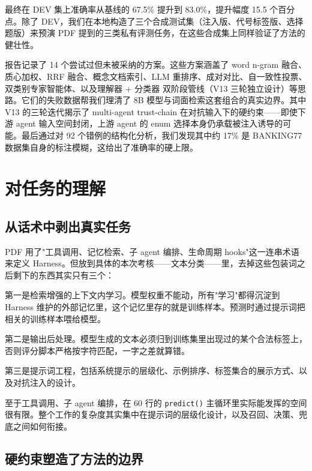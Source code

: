 \documentclass[11pt,a4paper]{article}
\begin{document}
最终在 DEV 集上准确率从基线的 67.5\% 提升到 83.0\%，提升幅度 15.5 个百分点。除了 DEV，我们在本地构造了三个合成测试集（注入版、代号标签版、选择题版）来预演 PDF 提到的三类私有评测任务，在这些合成集上同样验证了方法的健壮性。

报告记录了 14 个尝试过但未被采纳的方案。这些方案涵盖了 word n-gram 融合、质心加权、RRF 融合、概念文档索引、LLM 重排序、成对对比、自一致性投票、双类别专家智能体、以及理解器 + 分类器 双阶段管线（V13 三轮独立设计）等思路。它们的失败数据帮我们理清了 8B 模型与词面检索这套组合的真实边界。其中 V13 的三轮迭代揭示了 multi-agent trust-chain 在对抗输入下的硬约束——即使下游 agent 输入空间封闭，上游 agent 的 enum 选择本身仍承载被注入诱导的可能。最后通过对 92 个错例的结构化分析，我们发现其中约 17\% 是 BANKING77 数据集自身的标注模糊，这给出了准确率的硬上限。

\tableofcontents
\newpage

\section{对任务的理解}
\label{sec:problem}

\subsection{从话术中剥出真实任务}

PDF 用了"工具调用、记忆检索、子 agent 编排、生命周期 hooks"这一连串术语来定义 Harness。但放到具体的本次考核——文本分类——里，去掉这些包装词之后剩下的东西其实只有三个：

第一是检索增强的上下文内学习。模型权重不能动，所有"学习"都得沉淀到 Harness 维护的外部记忆里，这个记忆里存的就是训练样本。预测时通过提示词把相关的训练样本喂给模型。

第二是输出后处理。模型生成的文本必须归到训练集里出现过的某个合法标签上，否则评分脚本严格按字符匹配，一字之差就算错。

第三是提示词工程，包括系统提示的层级化、示例排序、标签集合的展示方式、以及对抗注入的设计。

至于工具调用、子 agent 编排，在 60 行的 \texttt{predict()} 主循环里实际能发挥的空间很有限。整个工作的复杂度其实集中在提示词的层级化设计，以及召回、决策、兜底之间如何衔接。

\subsection{硬约束塑造了方法的边界}
\end{document}
